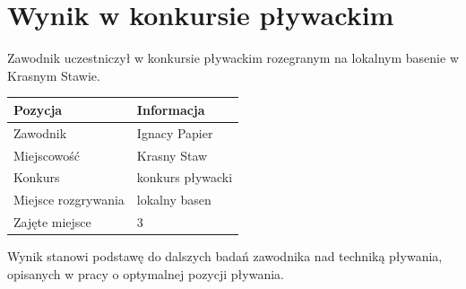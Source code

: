 \section*{Wynik w konkursie pływackim}
Zawodnik uczestniczył w konkursie pływackim rozegranym na lokalnym basenie w Krasnym Stawie.

\begin{tabularx}{\textwidth}{@{}lX@{}}
\toprule
\textbf{Pozycja} & \textbf{Informacja} \\
\midrule
Zawodnik & Ignacy Papier \\
Miejscowość & Krasny Staw \\
Konkurs & konkurs pływacki \\
Miejsce rozgrywania & lokalny basen \\
Zajęte miejsce & 3 \\
\bottomrule
\end{tabularx}

\vspace{0.5cm}
Wynik stanowi podstawę do dalszych badań zawodnika nad techniką pływania, opisanych w pracy o optymalnej pozycji pływania.
